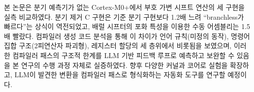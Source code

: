 본 논문은 분기 예측기가 없는 Cortex-M0+에서 부호 가변 시프트 연산의 세 구현을 실측
비교하였다. 분기 제거 C 구현은 기준 분기 구현보다 1.2배 느려 ``branchless가 빠르다''는
상식이 역전되었고, 배럴 시프터의 포화 특성을 이용한 수동 어셈블리는 1.5배 빨랐다. 컴파일러
생성 코드 분석을 통해 이 차이가 언어 규칙(미정의 동작), 명령어 집합 구조(2피연산자 파괴형),
레지스터 할당의 세 층위에서 비롯됨을 보였으며, 이러한 컴파일러 패스의 구조적 한계를 LLM
기반 피드백 루프로 예측하고 보완할 수 있음을 본 연구의 수행 과정 자체로 실증하였다. 향후
다양한 커널과 코어로 실험을 확장하고, LLM이 발견한 변환을 컴파일러 패스로 형식화하는
자동화 도구를 연구할 예정이다.
